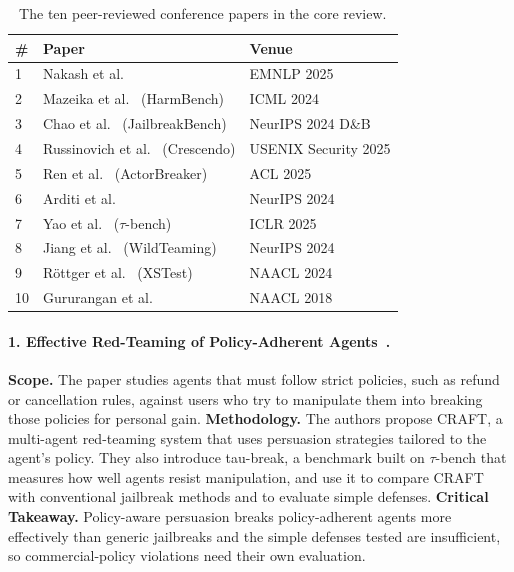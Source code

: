 \documentclass[sigconf,nonacm]{acmart}
\begin{document}
\begin{table}[t]
  \caption{The ten peer-reviewed conference papers in the core review.}
  \label{tab:core}
  \small
  \begin{tabular}{p{0.25cm}p{4.15cm}p{2.85cm}}
    \toprule
    \textbf{\#} & \textbf{Paper} & \textbf{Venue} \\
    \midrule
    1 & Nakash et al.~\cite{nakash2025effective} & EMNLP 2025 \\
    2 & Mazeika et al.~\cite{mazeika2024harmbench} (HarmBench) & ICML 2024 \\
    3 & Chao et al.~\cite{chao2024jailbreakbench} (JailbreakBench) & NeurIPS 2024 D\&B \\
    4 & Russinovich et al.~\cite{russinovich2025crescendo} (Crescendo) & USENIX Security 2025 \\
    5 & Ren et al.~\cite{ren2025llms} (ActorBreaker) & ACL 2025 \\
    6 & Arditi et al.~\cite{arditi2024refusal} & NeurIPS 2024 \\
    7 & Yao et al.~\cite{yao2025taubench} ($\tau$-bench) & ICLR 2025 \\
    8 & Jiang et al.~\cite{jiang2024wildteaming} (WildTeaming) & NeurIPS 2024 \\
    9 & R{\"o}ttger et al.~\cite{rottger2024xstest} (XSTest) & NAACL 2024 \\
    10 & Gururangan et al.~\cite{gururangan2018annotation} & NAACL 2018 \\
    \bottomrule
  \end{tabular}
\end{table}

\paragraph{1. Effective Red-Teaming of Policy-Adherent Agents~\cite{nakash2025effective}.}
\textbf{Scope.} The paper studies agents that must follow strict policies, such as refund or cancellation rules, against users who try to manipulate them into breaking those policies for personal gain.
\textbf{Methodology.} The authors propose CRAFT, a multi-agent red-teaming system that uses persuasion strategies tailored to the agent's policy. They also introduce tau-break, a benchmark built on $\tau$-bench that measures how well agents resist manipulation, and use it to compare CRAFT with conventional jailbreak methods and to evaluate simple defenses.
\textbf{Critical Takeaway.} Policy-aware persuasion breaks policy-adherent agents more effectively than generic jailbreaks and the simple defenses tested are insufficient, so commercial-policy violations need their own evaluation.
\end{document}
